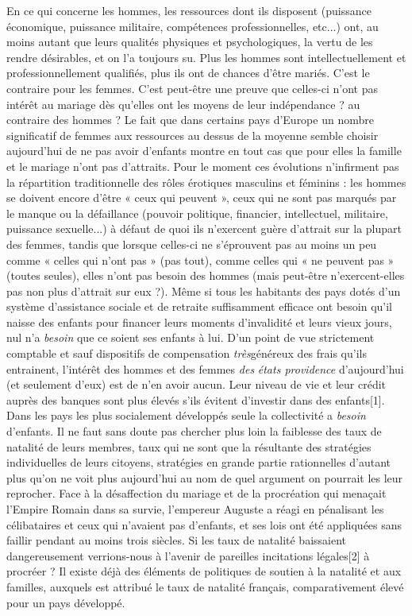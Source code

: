  En ce qui concerne les hommes, les ressources dont ils disposent (puissance économique, puissance militaire, compétences professionnelles, etc...) ont, au moins autant que leurs qualités physiques et psychologiques, la vertu de les rendre désirables, et on l'a toujours su. Plus les hommes sont intellectuellement et professionnellement qualifiés, plus ils ont de chances d'être mariés. C'est le contraire pour les femmes. C'est peut-être une preuve que celles-ci n'ont pas intérêt au mariage dès qu'elles ont les moyens de leur indépendance ? au contraire des hommes ? Le fait que dans certains pays d'Europe un nombre significatif de femmes aux ressources au dessus de la moyenne semble choisir aujourd'hui de ne pas avoir d'enfants montre en tout cas que pour elles la famille et le mariage n'ont pas d'attraits. 
 Pour le moment ces évolutions n'infirment pas la répartition traditionnelle des rôles érotiques masculins et féminins : les hommes se doivent encore d'être « ceux qui peuvent », ceux qui ne sont pas marqués par le manque ou la défaillance (pouvoir politique, financier, intellectuel, militaire, puissance sexuelle...) à défaut de quoi ils n'exercent guère d'attrait sur la plupart des femmes, tandis que lorsque celles-ci ne s'éprouvent pas au moins un peu comme « celles qui n'ont pas » (pas tout), comme celles qui « ne peuvent pas » (toutes seules), elles n'ont pas besoin des hommes (mais peut-être n'exercent-elles pas non plus d'attrait sur eux ?).
 Même si tous les habitants des pays dotés d'un système d'assistance sociale et de retraite suffisamment efficace ont besoin qu'il naisse des enfants pour financer leurs moments d'invalidité et leurs vieux jours, nul n'a \emph{besoin} que ce soient ses enfants à lui. D'un point de vue strictement comptable et sauf dispositifs de compensation \emph{très}généreux des frais qu'ils entrainent, l'intérêt des hommes et des femmes \emph{des} \emph{états providence} d'aujourd'hui (et seulement d'eux) est de n'en avoir aucun. Leur niveau de vie et leur crédit auprès des banques sont plus élevés s'ils évitent d'investir dans des enfants[1]. Dans les pays les plus socialement développés seule la collectivité a \emph{besoin} d'enfants. Il ne faut sans doute pas chercher plus loin la faiblesse des taux de natalité de leurs membres, taux qui ne sont que la résultante des stratégies individuelles de leurs citoyens, stratégies en grande partie rationnelles d'autant plus qu'on ne voit plus aujourd'hui au nom de quel argument on pourrait les leur reprocher. 
 Face à la désaffection du mariage et de la procréation qui menaçait l'Empire Romain dans sa survie, l'empereur Auguste a réagi en pénalisant les célibataires et ceux qui n'avaient pas d'enfants, et ses lois ont été appliquées sans faillir pendant au moins trois siècles. Si les taux de natalité baissaient dangereusement verrions-nous à l'avenir de pareilles incitations légales[2] à procréer ? Il existe déjà des éléments de politiques de soutien à la natalité et aux familles, auxquels est attribué le taux de natalité français, comparativement élevé pour un pays développé.
